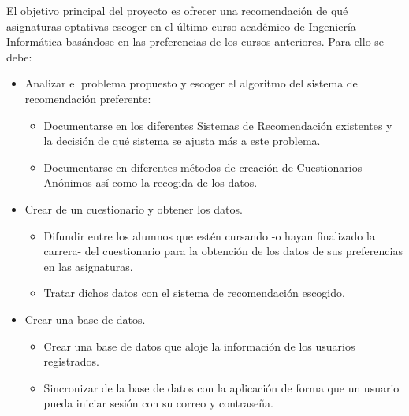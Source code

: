 El objetivo principal del proyecto es ofrecer una recomendación de qué  asignaturas optativas escoger en el último curso académico de Ingeniería Informática basándose en las preferencias de los cursos anteriores. Para ello se debe: 
\begin{itemize}
\item Analizar el problema propuesto y escoger el algoritmo del sistema de recomendación preferente: 
\begin{itemize}
\item Documentarse en los diferentes Sistemas de Recomendación existentes y la decisión de qué sistema se ajusta más a este problema. 
\item Documentarse en diferentes métodos de creación de Cuestionarios Anónimos así como la recogida de los datos. 
\end{itemize}
\item Crear de un cuestionario y obtener los datos. 
\begin{itemize}
\item Difundir entre  los alumnos que estén cursando -o hayan finalizado la carrera- del cuestionario para la obtención de los datos de sus preferencias en las asignaturas. 
\item Tratar dichos datos con el sistema de recomendación escogido.
\end{itemize}
\item Crear una base de datos. 
\begin{itemize}
\item Crear una base de datos que aloje la información de los usuarios registrados.
\item Sincronizar de la base de datos con la aplicación de forma que un usuario pueda iniciar sesión con su correo y contraseña. 
\end{itemize}
\end{itemize}